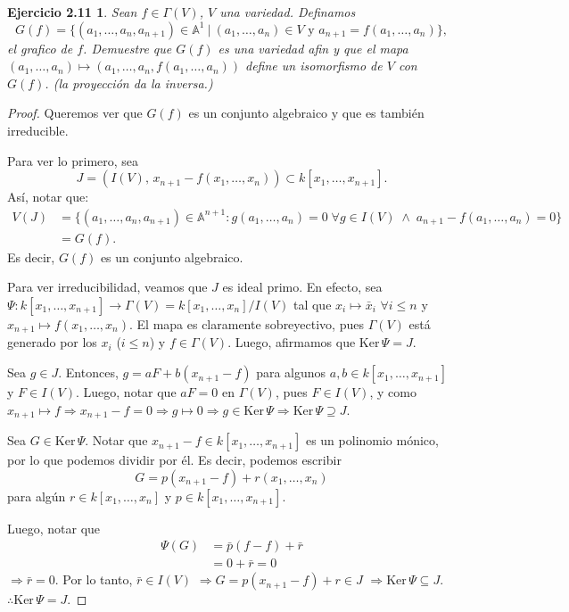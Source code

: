 \documentclass[12pt,a4paper]{article}
\theoremstyle{plain}
\newtheorem*{ejercicio2}{Ejercicio 2.11}
\newcommand{\A}{\mathbb{A}}
\newcommand{\Ker}{\mathrm{Ker}\,}
\begin{document}

\begin{ejercicio2}	
	Sean $f \in \Gamma(V)$, $V$ una variedad. Definamos
	\[ G(f) = \{(a_{1}, \dots, a_{n}, a_{n + 1}) \in \mathbb{A}^{1} \ | \ (a_{1},\dots,a_{n}) \in V \text{ y } a_{n + 1} = f(a_{1},\dots,a_{n})\}, \]
	el grafico de $f$. Demuestre que $G(f)$ es una variedad afin y que el mapa $(a_{1},\dots,a_{n}) \mapsto (a_{1},\dots,a_{n},f(a_{1},\dots,a_{n}))$ define un isomorfismo de $V$ con $G(f)$. (la proyección da la inversa.)
\end{ejercicio2}

\begin{proof}
	Queremos ver que $G(f)$ es un conjunto algebraico y que es también irreducible.

	Para ver lo primero, sea
	\[
	  J=(I(V),\,x_{n+1}-f(x_1,\ldots,x_n)) \subset k[x_1,\ldots,x_{n+1}].
	\]
	Así, notar que:
	\begin{align*}
		V(J) &= \{(a_1,\ldots,a_n,a_{n+1}) \in \A^{n+1} : g(a_1,\ldots,a_n) = 0\;\forall g \in I(V) \;\wedge\; a_{n+1}-f(a_1,\ldots,a_n)=0\bigr\} \\
		&= G(f).
	\end{align*}
	Es decir, $G(f)$ es un conjunto algebraico.

	Para ver irreducibilidad, veamos que $J$ es ideal primo. En efecto, sea $\Psi:k[x_1,\ldots,x_{n+1}]\to\Gamma(V)=k[x_1,\ldots,x_n]/I(V)$ tal que $x_i\mapsto\bar{x}_i$ $\forall i\leq n$ y $x_{n+1}\mapsto f(x_1,\ldots,x_n)$. El mapa es claramente sobreyectivo, pues $\Gamma(V)$ está generado por los $x_i$ ($i\leq n$) y $f\in\Gamma(V)$. Luego, afirmamos que $\Ker\Psi=J$.

	\boxed{\supseteq} Sea $g\in J$. Entonces, $g=aF+b(x_{n+1}-f)$ para algunos $a,b\in k[x_1,\ldots,x_{n+1}]$ y $F \in I(V)$. Luego, notar que $aF=0$ en $\Gamma(V)$, pues $F \in I(V)$, y como $x_{n+1}\mapsto f \Rightarrow x_{n+1}-f=0 \Rightarrow g \mapsto 0\Rightarrow g\in\Ker\Psi\Rightarrow\Ker\Psi\supseteq J$.

	\boxed{\subseteq} Sea $G\in\Ker\Psi$. Notar que $x_{n+1}-f\in k[x_1,\ldots,x_{n+1}]$ es un polinomio mónico, por lo que podemos dividir por él. Es decir, podemos escribir
	\[
	  G = p(x_{n+1}-f)+r(x_1,\ldots,x_n)
	\]
	para algún $r\in k[x_1,\ldots,x_n]$ y $p\in k[x_1,\ldots,x_{n+1}]$.

	Luego, notar que
	\begin{align*}
		\Psi(G) &= \bar{p}(f-f)+\bar{r}\\
		&= 0+\bar{r} = 0
	\end{align*}
	$\Rightarrow\bar{r}=0$. Por lo tanto, $\bar{r}\in I(V)$
	$\Rightarrow G=p(x_{n+1}-f)+r\in J$
	$\Rightarrow\Ker\Psi\subseteq J$. $\therefore\Ker\Psi=J$.


\end{proof}
\end{document}
